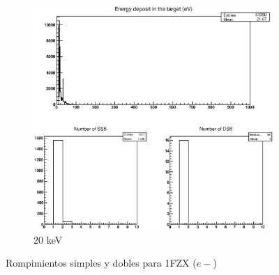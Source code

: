 \begin{figure}
\begin{subfigure}{.5\textwidth}
  \includegraphics[width=.78\linewidth]{./Figures/1fzxe20kev.eps}
  \caption{20 keV}
  \label{fig:sube8}
\end{subfigure}
\caption{Rompimientos simples y dobles para 1FZX ($e-$)}
\label{fig:e2}
\end{figure}




